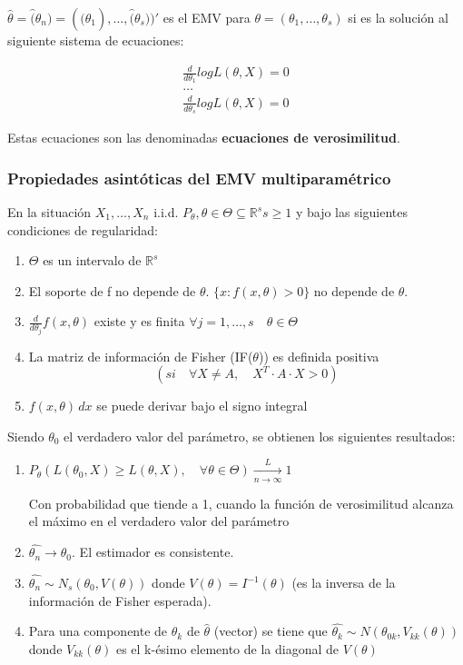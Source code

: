 $\hat{\theta}=\hat(\theta_n)=(\hat(\theta_1),\dots,\hat(\theta_s))'$ es el EMV para $\theta=(\theta_1,\dots,\theta_s)$
si es la solución al siguiente sistema de ecuaciones:

\[
\begin{matrix}
    \frac{d}{d \theta_1} log L(\theta,X)=0 \\
    \dots \\
    \frac{d}{d \theta_s} log L(\theta,X)=0
\end{matrix}
\]

Estas ecuaciones son las denominadas \textbf{ecuaciones de verosimilitud}.

\subsubsection*{Propiedades asintóticas del EMV multiparamétrico}

En la situación $X_1,\dots,X_n$ i.i.d. $P_\theta, \theta \in \Theta \subseteq \mathbb{R}^s s\geq1$
y bajo las siguientes condiciones de regularidad:

\begin{enumerate}
    \item $\Theta$ es un intervalo de $\mathbb{R}^s$
    \item El soporte de f no depende de $\theta$. $\{x:f(x,\theta)>0\}$ no depende de $\theta$.
    \item $\frac{d}{d \theta_j} f(x,\theta)$ existe y es finita $\forall j=1,\dots,s \quad \theta \in \Theta$
    \item La matriz de información de Fisher (IF($\theta$)) es definida positiva \[ (si \quad \forall X \neq A, \quad X^T \cdot A \cdot X >0) \]
    \item $f(x,\theta) \,dx$ se puede derivar bajo el signo integral
\end{enumerate}
\newpage
Siendo $\theta_0$ el verdadero valor del parámetro, se obtienen los siguientes resultados:

\begin{enumerate}
    \item $P_\theta(L(\theta_0,X)\geq L(\theta,X),\quad \forall \theta \in \Theta) \xrightarrow[n \to \infty]{L}1$
    
    Con probabilidad que tiende a 1, cuando la función de verosimilitud alcanza el máximo en el verdadero valor del parámetro
    \item $\hat{\theta_n} \to \theta_0$. El estimador es consistente.
    \item $\hat{\theta_n} \sim N_s(\theta_0,V(\theta))$ donde $V(\theta)=I^{-1}(\theta)$ (es la inversa de la información de Fisher esperada).
    \item Para una componente de $\hat{\theta_k}$ de $\hat{\theta}$ (vector) se tiene que $\hat{\theta_k} \sim N(\theta_{0k},V_{kk}(\theta))$
    donde $V_{kk}(\theta)$ es el k-ésimo elemento de la diagonal de $V(\theta)$
\end{enumerate}

